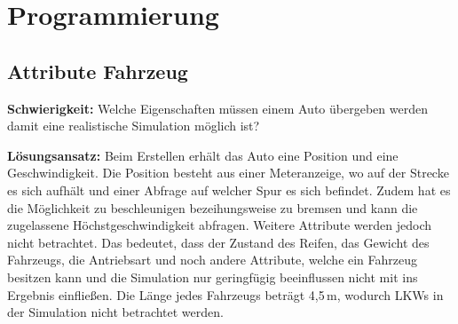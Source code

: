 \chapter{Programmierung}
\section{Attribute Fahrzeug}
\textbf{Schwierigkeit:} Welche Eigenschaften müssen einem Auto übergeben werden damit eine realistische Simulation möglich ist?
\begin{addmargin}[25pt]{0pt}
	\item \textbf{Lösungsansatz:} Beim Erstellen erhält das Auto eine Position und eine Geschwindigkeit. Die Position besteht aus einer Meteranzeige, wo auf der Strecke es sich aufhält und einer Abfrage auf welcher Spur es sich befindet. Zudem hat es die Möglichkeit zu beschleunigen bezeihungsweise zu bremsen und kann die zugelassene Höchstgeschwindigkeit abfragen. Weitere Attribute werden jedoch nicht betrachtet. Das bedeutet, dass der Zustand des Reifen, das Gewicht des Fahrzeugs, die Antriebsart und noch andere Attribute, welche ein Fahrzeug besitzen kann und die Simulation nur geringfügig beeinflussen nicht mit ins Ergebnis einfließen. Die Länge jedes Fahrzeugs beträgt 4,5\,m, wodurch LKWs in der Simulation nicht betrachtet werden. \\
\end{addmargin}

